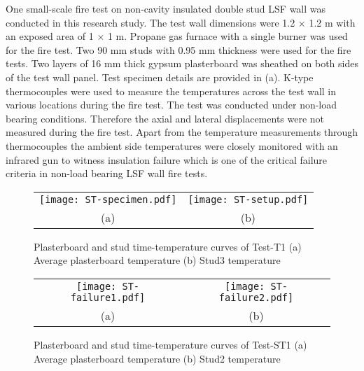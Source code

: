 One small-scale fire test on non-cavity insulated double stud LSF wall was conducted in this research study. The test wall dimensions were 1.2 \(\times\) 1.2 m with an exposed area of 1 \(\times\) 1 m. Propane gas furnace with a single burner was used for the fire test. Two 90 mm studs with 0.95 mm thickness were used for the fire tests. Two layers of 16 mm thick gypsum plasterboard was sheathed on both sides of the test wall panel. Test specimen details are provided in (a). K-type thermocouples were used to measure the temperatures across the test wall in various locations during the fire test. The test was conducted under non-load bearing conditions. Therefore the axial and lateral displacements were not measured during the fire test. Apart from the temperature measurements through thermocouples the ambient side temperatures were closely monitored with an infrared gun to witness insulation failure which is one of the critical failure criteria in non-load bearing LSF wall fire tests. 
\begin{figure}[!htbp]
	\centering
		\begin{tabular}{cc}
			\texttt{[image: ST-specimen.pdf]} & \texttt{[image: ST-setup.pdf]} \\ 
			(a) & (b)  \\ 
		\end{tabular} 
		\caption{Plasterboard and stud time-temperature curves of Test-T1 (a) Average plasterboard temperature (b) Stud3 temperature}
		\label{fig:ST-setup}
\end{figure}
\begin{figure}[!htbp]
	\centering
		\begin{tabular}{cc}
			\texttt{[image: ST-failure1.pdf]} & \texttt{[image: ST-failure2.pdf]} \\ 
			(a) & (b)  \\ 
		\end{tabular} 
		\caption{Plasterboard and stud time-temperature curves of Test-ST1 (a) Average plasterboard temperature (b) Stud2 temperature}
		\label{fig:ST-failure}
\end{figure}

